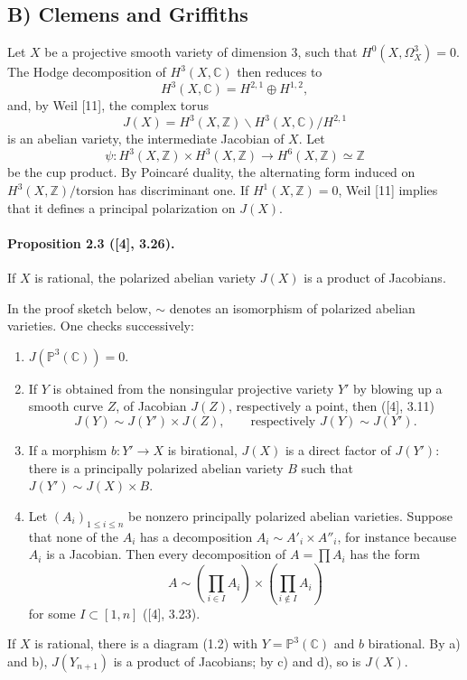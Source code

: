 \documentclass[10pt]{article}
\newcommand{\C}{\mathbb C}
\newcommand{\Pj}{\mathbb P}
\newcommand{\Z}{\mathbb Z}
\begin{document}
\subsection*{B) Clemens and Griffiths}

Let \(X\) be a projective smooth variety of dimension \(3\), such that \(H^0(X,\Omega_X^3)=0\). The Hodge decomposition of \(H^3(X,\C)\) then reduces to
\[
H^3(X,\C)=H^{2,1}\oplus H^{1,2},
\]
and, by Weil [11], the complex torus
\[
J(X)=H^3(X,\Z)\backslash H^3(X,\C)/H^{2,1}
\]
is an abelian variety, the intermediate Jacobian of \(X\). Let
\[
\psi:H^3(X,\Z)\times H^3(X,\Z)\longrightarrow H^6(X,\Z)\simeq\Z
\]
be the cup product. By Poincaré duality, the alternating form induced on \(H^3(X,\Z)/\text{torsion}\) has discriminant one. If \(H^1(X,\Z)=0\), Weil [11] implies that it defines a principal polarization on \(J(X)\).

\paragraph{Proposition 2.3 ([4], 3.26).} If \(X\) is rational, the polarized abelian variety \(J(X)\) is a product of Jacobians.

In the proof sketch below, \(\sim\) denotes an isomorphism of polarized abelian varieties. One checks successively:
\begin{enumerate}[label=\alph*)]
\item \(J(\Pj^3(\C))=0\).
\item If \(Y\) is obtained from the nonsingular projective variety \(Y'\) by blowing up a smooth curve \(Z\), of Jacobian \(J(Z)\), respectively a point, then ([4], 3.11)
\[
J(Y)\sim J(Y')\times J(Z),\qquad\text{respectively }J(Y)\sim J(Y').
\]
\item If a morphism \(b:Y'\to X\) is birational, \(J(X)\) is a direct factor of \(J(Y')\): there is a principally polarized abelian variety \(B\) such that \(J(Y')\sim J(X)\times B\).
\item Let \((A_i)_{1\le i\le n}\) be nonzero principally polarized abelian varieties. Suppose that none of the \(A_i\) has a decomposition \(A_i\sim A'_i\times A''_i\), for instance because \(A_i\) is a Jacobian. Then every decomposition of \(A=\prod A_i\) has the form
\[
A\sim \left(\prod_{i\in I}A_i\right)\times\left(\prod_{i\notin I}A_i\right)
\]
for some \(I\subset[1,n]\) ([4], 3.23).
\end{enumerate}
If \(X\) is rational, there is a diagram (1.2) with \(Y=\Pj^3(\C)\) and \(b\) birational. By a) and b), \(J(Y_{n+1})\) is a product of Jacobians; by c) and d), so is \(J(X)\).
\end{document}
